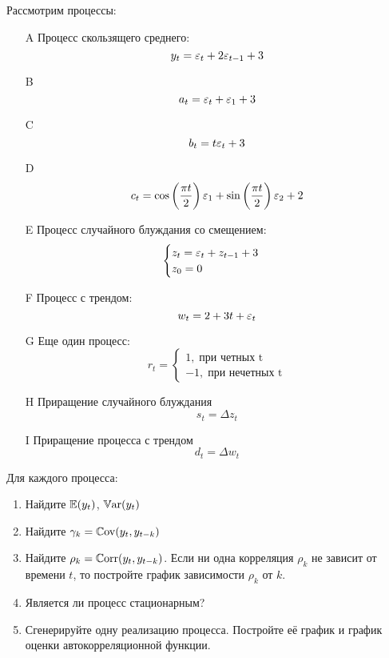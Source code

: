 \begin{problem}
Рассмотрим процессы:

\begin{enumerate}
\item[A] Процесс скользящего среднего:
\[
y_t=\varepsilon_t+2\varepsilon_{t-1}+3
\]

\item[B]
\[
a_t=\varepsilon_t+\varepsilon_1 + 3
\]

\item[C]
\[
b_t=t\varepsilon_t + 3
\]

\item[D]
\[
c_t=\cos\left(\frac{\pi t}{2}\right)\varepsilon_1 + \sin\left(\frac{\pi t}{2}\right)\varepsilon_2 + 2
\]

\item[E] Процесс случайного блуждания со смещением:
\[
\begin{cases}
z_t=\varepsilon_t+z_{t-1}+3 \\
z_0=0
\end{cases}
\]

\item[F] Процесс с трендом:
\[
w_t=2+3t+\varepsilon_t
\]

\item[G] Еще один процесс:
\[
r_t=\begin{cases}
1, \; \text{при четных t} \\
-1, \; \text{при нечетных t}
\end{cases}
\]

\item[H] Приращение случайного блуждания
\[
s_t=\Delta z_t
\]

\item[I] Приращение процесса с трендом
\[
d_t=\Delta w_t
\]
\end{enumerate}

Для каждого процесса:

\begin{enumerate}
\item Найдите $\operatorname{\mathbb{E}}(y_t)$, $\operatorname{\mathbb{V}\mathrm{ar}}(y_t)$
\item Найдите $\gamma_k = \operatorname{\mathbb{C}\mathrm{ov}}(y_t, y_{t-k})$
\item Найдите $\rho_k = \operatorname{\mathbb{C}\mathrm{orr}}(y_t,y_{t-k})$. Если ни одна корреляция $\rho_k$ не зависит от времени $t$, то постройте график зависимости $\rho_k$ от $k$.
\item Является ли процесс стационарным?
\item Сгенерируйте одну реализацию процесса. Постройте её график и график оценки автокорреляционной функции.
\end{enumerate}



\end{problem}
